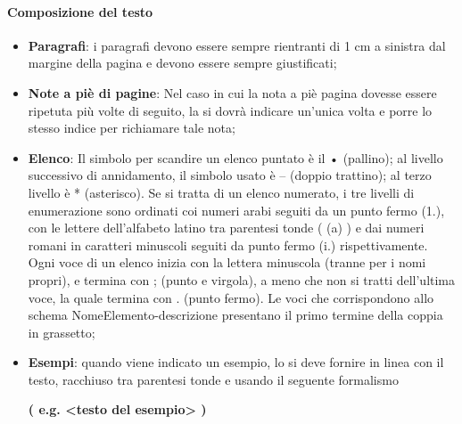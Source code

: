             \paragraph{Composizione del testo}
                \begin{itemize}
                    \item\textbf{Paragrafi}: i paragrafi devono essere sempre rientranti di 1 cm a sinistra dal margine della pagina e devono essere sempre giustificati;
                    \item\textbf{Note a piè di pagine}: Nel caso in cui la nota a piè pagina dovesse essere ripetuta più volte di seguito, la si dovrà indicare un’unica volta e porre lo stesso indice per richiamare tale nota; 
                    \item\textbf{Elenco}: Il simbolo per scandire un elenco puntato è il • (pallino); al livello successivo di annidamento, il simbolo usato è – (doppio trattino); al terzo livello è * (asterisco). Se si tratta di un elenco numerato, i tre livelli di enumerazione sono ordinati coi numeri arabi seguiti da un punto fermo (1.), con le lettere dell’alfabeto latino tra parentesi tonde ( (a) ) e dai numeri romani in caratteri minuscoli seguiti da punto fermo (i.) rispettivamente. Ogni voce di un elenco inizia con la lettera minuscola (tranne per i nomi propri), e termina con ; (punto e virgola), a meno che non si tratti dell’ultima voce, la quale termina con . (punto fermo). Le voci che corrispondono allo schema NomeElemento-descrizione presentano il primo termine della coppia in grassetto;
                    \item\textbf{Esempi}: quando viene indicato un esempio, lo si deve fornire in linea con il testo, racchiuso tra parentesi tonde e usando il seguente formalismo
                        \begin{center}
                            \textbf{( e.g. <testo del esempio> )}
                        \end{center}
                \end{itemize}

